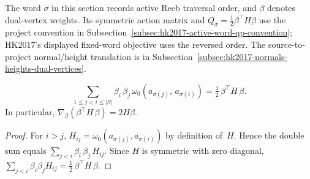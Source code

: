 %
%
%


%
%
%

The word $\sigma$ in this section records active Reeb traversal order, and
$\beta$ denotes dual-vertex weights.  Its symmetric action matrix and
$Q_\sigma=\frac12\beta^\top H\beta$ use the project convention in
Subsection~\ref{subsec:hk2017-active-word-qp-convention}; HK2017's displayed
fixed-word objective uses the reversed order.  The source-to-project
normal/height translation is in
Subsection~\ref{subsec:hk2017-normals-heights-dual-vertices}.


\begin{notationupdated}
\begin{lemma}\label{lem:H-quadratic}
\[
  \sum_{1 \leq j < i \leq |S|}
    \beta_i\, \beta_j\,
    \omega_0(a_{\sigma(j)},\, a_{\sigma(i)})
  = \tfrac{1}{2}\, \beta^\top H\, \beta.
\]
In particular,
$\nabla_{\beta}
  (\beta^\top H\, \beta) = 2H \beta$.
\end{lemma}

\begin{proof}
For $i > j$,
$H_{ij} = \omega_0(a_{\sigma(j)}, a_{\sigma(i)})$
by definition of~$H$.
Hence the double sum equals
$\sum_{j < i} \beta_i\, \beta_j\, H_{ij}$.
Since $H$ is symmetric with zero diagonal,
$\sum_{j < i} \beta_i \beta_j H_{ij}
= \tfrac{1}{2}\, \beta^\top H\, \beta$.
\end{proof}
\end{notationupdated}

